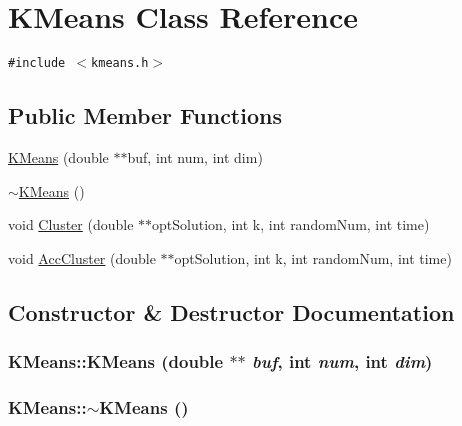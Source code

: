 \hypertarget{classKMeans}{
\section{KMeans Class Reference}
\label{classKMeans}
}
{\tt \#include $<$kmeans.h$>$}

\subsection*{Public Member Functions}
\begin{CompactItemize}
\item 
\hyperlink{classKMeans_cf11df84106dc41974c844e95c8067a0}{KMeans} (double $\ast$$\ast$buf, int num, int dim)
\item 
\hyperlink{classKMeans_63e21569b60978c8dfca1fc468d12f19}{$\sim$KMeans} ()
\item 
void \hyperlink{classKMeans_7bbee987d930a8619d4252a8684e49f8}{Cluster} (double $\ast$$\ast$optSolution, int k, int randomNum, int time)
\item 
void \hyperlink{classKMeans_e6d90d4b1137147b086e22e2a14898fd}{AccCluster} (double $\ast$$\ast$optSolution, int k, int randomNum, int time)
\end{CompactItemize}


\subsection{Constructor \& Destructor Documentation}
\hypertarget{classKMeans_cf11df84106dc41974c844e95c8067a0}{
\subsubsection[{KMeans}]{\setlength{\rightskip}{0pt plus 5cm}KMeans::KMeans (double $\ast$$\ast$ {\em buf}, \/  int {\em num}, \/  int {\em dim})}}
\label{classKMeans_cf11df84106dc41974c844e95c8067a0}


\hypertarget{classKMeans_63e21569b60978c8dfca1fc468d12f19}{
\subsubsection[{$\sim$KMeans}]{\setlength{\rightskip}{0pt plus 5cm}KMeans::$\sim$KMeans ()}}
\label{classKMeans_63e21569b60978c8dfca1fc468d12f19}




